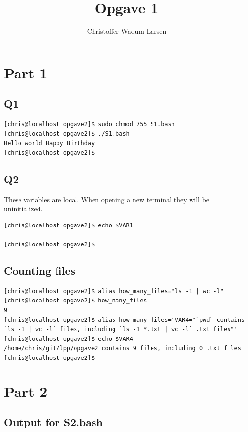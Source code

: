 \documentclass[12pt]{article}
\title{Opgave 1}
\author{Christoffer Wadum Larsen}
\begin{document}
\maketitle

\section{Part 1}

\subsection{Q1}

\begin{lstlisting}
[chris@localhost opgave2]$ sudo chmod 755 S1.bash 
[chris@localhost opgave2]$ ./S1.bash 
Hello world Happy Birthday
[chris@localhost opgave2]$ 
\end{lstlisting}

\subsection{Q2}

These variables are local. When opening a new terminal they will be uninitialized.

\begin{lstlisting}
[chris@localhost opgave2]$ echo $VAR1

[chris@localhost opgave2]$ 
\end{lstlisting}

\subsection{Counting files}

\begin{lstlisting}
[chris@localhost opgave2]$ alias how_many_files="ls -1 | wc -l"
[chris@localhost opgave2]$ how_many_files
9
[chris@localhost opgave2]$ alias how_many_files='VAR4="`pwd` contains `ls -1 | wc -l` files, including `ls -1 *.txt | wc -l` .txt files"'
[chris@localhost opgave2]$ echo $VAR4
/home/chris/git/lpp/opgave2 contains 9 files, including 0 .txt files
[chris@localhost opgave2]$ 
\end{lstlisting}

\section{Part 2}

\subsection{Output for S2.bash}
\end{document}
